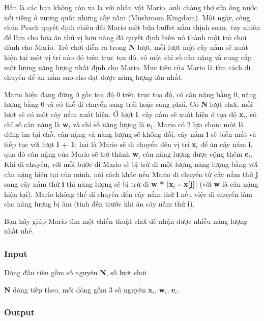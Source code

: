 

Hẳn là các bạn không còn xa lạ với nhân vật Mario, anh chàng thợ sửa ống nước nổi tiếng ở vương quốc những cây nấm (Mushroom Kingdom). Một ngày, công chúa Peach quyết định chiêu đãi Mario một bữa buffet nấm thịnh soạn, tuy nhiên để làm cho bữa ăn thú vị hơn nàng đã quyết định biến nó thành một trò chơi dành cho Mario. Trò chơi diễn ra trong \textbf{N} lượt, mỗi lượt một cây nấm sẽ xuất hiện tại một vị trí nào đó trên trục tọa độ, có một chỉ số cân nặng và cung cấp một lượng năng lượng nhất định cho Mario. Mục tiêu của Mario là tìm cách di chuyển để ăn nấm sao cho đạt được năng lượng lớn nhất.

Mario hiện đang đứng ở gốc tọa độ 0 trên trục tọa độ, có cân nặng bằng 0, năng lượng bằng 0 và có thể di chuyển sang trái hoặc sang phải. Có \textbf{N} lượt chơi, mỗi lượt sẽ có một cây nấm xuất hiện. Ở lượt \textbf{i}, cây nấm sẽ xuất hiện ở tọa độ \textbf{x$_i$}, có chỉ số cân nặng là \textbf{w$_i$} và chỉ số năng lượng là \textbf{e$_i$}. Mario có 2 lựa chọn: một là đứng im tại chỗ, cân nặng và năng lượng sẽ không đổi, cây nấm \textbf{i} sẽ biến mất và tiếp tục với lượt \textbf{i + 1}; hai là Mario sẽ di chuyển đến vị trí \textbf{x$_i$} để ăn cây nấm \textbf{i}, qua đó cân nặng của Mario sẽ trở thành \textbf{w$_i$} còn năng lượng được cộng thêm \textbf{e$_i$}. Khi di chuyển, với mỗi bước đi Mario sẽ bị trừ đi một lượng năng lượng bằng với cân nặng hiện tại của mình, nói cách khác nếu Mario di chuyển từ cây nấm thứ \textbf{j} sang cây nấm thứ \textbf{i} thì năng lượng sẽ bị trừ đi \textbf{w * |x$_i$ - x[j]|} (với \textbf{w} là cân nặng hiện tại). Mario không thể di chuyển đến cây nấm thứ \textbf{i} nếu việc di chuyển làm cho năng lượng bị âm (tính đến trước khi ăn cây nấm thứ \textbf{i}).

Bạn hãy giúp Mario tìm một chiến thuật chơi để nhận được nhiều năng lượng nhất nhé.

\subsubsection{Input}

Dòng đầu tiên gồm số nguyên \textbf{N}, số lượt chơi.

\textbf{N} dòng tiếp theo, mỗi dòng gồm 3 số nguyên \textbf{x$_i$}, \textbf{w$_i$}, \textbf{e$_i$}.

\subsubsection{Output}

